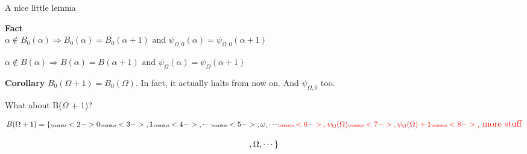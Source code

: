 \documentclass{beamer}
\begin{document}
\begin{frame}{A nice little lemma}
\begin{minipage}{\textwidth}

    \textbf{Fact} \\
    
    
    $\alpha \notin B_0(\alpha) \Rightarrow B_0(\alpha) = B_0(\alpha + 1) \text{ and }\psi_{\Omega,0}(\alpha) = \psi_{\Omega,0}(\alpha+1)$ \\ \pause
    

    $\alpha \notin B(\alpha) \Rightarrow B(\alpha) = B(\alpha + 1) \text{ and }\psi_{\Omega}(\alpha) = \psi_{\Omega}(\alpha+1)$ \\ \pause
    
    \textbf{Corollary} $B_0(\Omega+1) = B_0(\Omega)$. In fact, it actually halts from now on. And $\psi_{\Omega,0}$ too.
\end{minipage}
\end{frame}


\begin{frame}{What about B($\Omega$ + 1)?}
\begin{minipage}{0.85\textwidth}
\begin{align*}
\tiny
    B(\Omega+1) = \{\visible<2->{0}\visible<3->{,1}\visible<4->{,\cdots}\visible<5->{,\omega,\cdots}\color{red}\visible<6->{,\psi_{\Omega}(\Omega)\visible<7->{,\psi_{\Omega}(\Omega)+1}\visible<8->{\text{\large, more stuff}}\color{black}}
\end{align*} 

\end{minipage}
\begin{minipage}{0.1\textwidth}
\begin{align*}
    \raggedright , \Omega,\cdots\}
\end{align*}
\end{minipage}\hfill\newline\newline







\end{frame}
\end{document}
